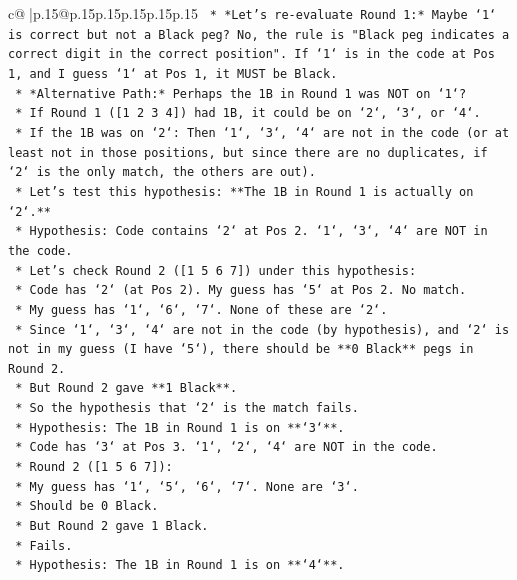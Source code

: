 \documentclass{article}
\begin{document}
{\begin{supertabular}{c@{$\;$}|p{.15\linewidth}@{}p{.15\linewidth}p{.15\linewidth}p{.15\linewidth}p{.15\linewidth}p{.15\linewidth}}
{{{\texttt{    *   *Let's re{-}evaluate Round 1:* Maybe `1` is correct but not a Black peg? No, the rule is "Black peg indicates a correct digit in the correct position". If `1` is in the code at Pos 1, and I guess `1` at Pos 1, it MUST be Black.} \\
\texttt{    *   *Alternative Path:* Perhaps the 1B in Round 1 was NOT on `1`?} \\
\texttt{        *   If Round 1 ({[}1 2 3 4{]}) had 1B, it could be on `2`, `3`, or `4`.} \\
\texttt{        *   If the 1B was on `2`: Then `1`, `3`, `4` are not in the code (or at least not in those positions, but since there are no duplicates, if `2` is the only match, the others are out).} \\
\texttt{        *   Let's test this hypothesis: **The 1B in Round 1 is actually on `2`.**} \\
\texttt{        *   Hypothesis: Code contains `2` at Pos 2. `1`, `3`, `4` are NOT in the code.} \\
\texttt{        *   Let's check Round 2 ({[}1 5 6 7{]}) under this hypothesis:} \\
\texttt{            *   Code has `2` (at Pos 2). My guess has `5` at Pos 2. No match.} \\
\texttt{            *   My guess has `1`, `6`, `7`. None of these are `2`.} \\
\texttt{            *   Since `1`, `3`, `4` are not in the code (by hypothesis), and `2` is not in my guess (I have `5`), there should be **0 Black** pegs in Round 2.} \\
\texttt{            *   But Round 2 gave **1 Black**.} \\
\texttt{            *   So the hypothesis that `2` is the match fails.} \\
\texttt{        *   Hypothesis: The 1B in Round 1 is on **`3`**.} \\
\texttt{            *   Code has `3` at Pos 3. `1`, `2`, `4` are NOT in the code.} \\
\texttt{            *   Round 2 ({[}1 5 6 7{]}):} \\
\texttt{                *   My guess has `1`, `5`, `6`, `7`. None are `3`.} \\
\texttt{                *   Should be 0 Black.} \\
\texttt{                *   But Round 2 gave 1 Black.} \\
\texttt{                *   Fails.} \\
\texttt{        *   Hypothesis: The 1B in Round 1 is on **`4`**.} \\
}}}
\end{supertabular}}
\end{document}
